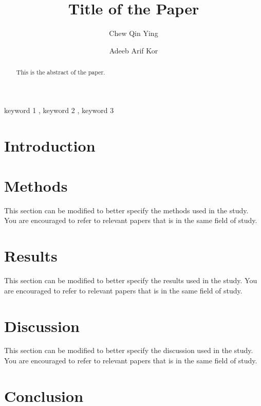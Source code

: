 \documentclass[preprint,3p,number]{elsarticle}
\begin{document}
\begin{frontmatter}
\title{Title of the Paper}

\author[inst2]{Chew Qin Ying}

\author[inst1]{Adeeb Arif Kor}

\begin{abstract}
    This is the abstract of the paper.
\end{abstract}

\begin{keyword}
    keyword 1 \sep
    keyword 2 \sep
    keyword 3
\end{keyword}

\end{frontmatter}

\section{Introduction}

\section{Methods}

This section can be modified to better specify the methods used in the study.
You are encouraged to refer to relevant papers that is in the same field of
study.

\section{Results}

This section can be modified to better specify the results used in the study.
You are encouraged to refer to relevant papers that is in the same field of
study.

\section{Discussion}

This section can be modified to better specify the discussion used in the study.
You are encouraged to refer to relevant papers that is in the same field of
study.

\section{Conclusion}
\end{document}
